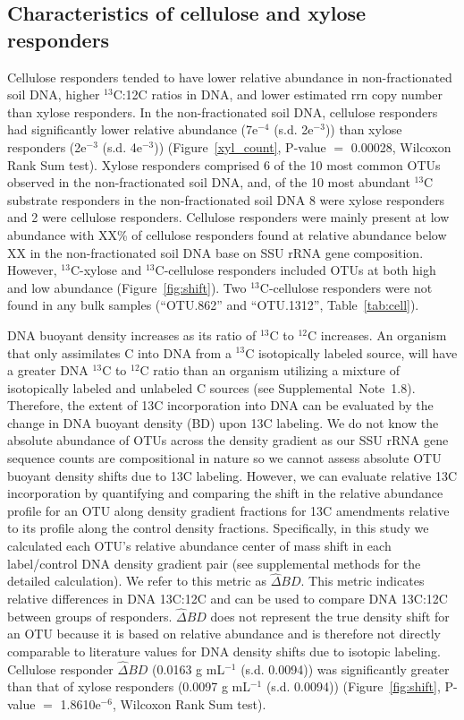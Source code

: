 \subsection{Characteristics of cellulose and xylose responders}
Cellulose responders tended to have lower relative abundance in
non-fractionated soil DNA, higher $^{13}$C:12C ratios in DNA, and lower estimated
rrn copy number than xylose responders. In the non-fractionated soil DNA,
cellulose responders had significantly lower relative abundance (7e$^{-4}$
(s.d. 2e$^{-3}$)) than xylose responders (2e$^{-3}$ (s.d. 4e$^{-3}$))
(Figure~\ref{xyl_count}, P-value $=$ 0.00028, Wilcoxon Rank Sum test). Xylose
responders comprised 6 of the 10 most common OTUs observed in the
non-fractionated soil DNA, and, of the 10 most abundant $^{13}$C substrate
responders in the non-fractionated soil DNA
8 were xylose responders and 2 were cellulose responders. Cellulose responders
were mainly present at low abundance with XX\% of cellulose responders found at
relative abundance below XX in the non-fractionated soil DNA base on SSU rRNA
gene composition. However, $^{13}$C-xylose and $^{13}$C-cellulose responders
included OTUs at both high and low abundance (Figure~\ref{fig:shift}). Two
$^{13}$C-cellulose responders were not found in any bulk samples (``OTU.862''
and ``OTU.1312'', Table~\ref{tab:cell}).

DNA buoyant density increases as its ratio of $^{13}$C to $^{12}$C increases.
An organism that only assimilates C into DNA from a $^{13}$C isotopically
labeled source, will have a greater DNA $^{13}$C to $^{12}$C ratio 
than an organism utilizing a mixture of isotopically labeled and unlabeled
C sources (see Supplemental~Note~1.8). Therefore, the extent of 13C
incorporation into DNA can be evaluated by the change in DNA buoyant density
(BD) upon 13C labeling. We do not know the absolute abundance of OTUs across
the density gradient as our SSU rRNA gene sequence counts are compositional in
nature so we cannot assess absolute OTU buoyant density shifts due to 13C
labeling. However, we can evaluate relative 13C incorporation by quantifying
and comparing the shift in the relative abundance profile for an OTU along
density gradient fractions for 13C amendments relative to its profile along the
control density fractions. Specifically, in this study we calculated each OTU's
relative abundance center of mass shift in each label/control DNA density
gradient pair (see supplemental methods for the detailed calculation). We refer
to this metric as $\hat{\Delta}BD$. This metric indicates relative differences
in DNA 13C:12C and can be used to compare DNA 13C:12C between groups of
responders. $\hat{\Delta}BD$ does not represent the true density shift for an
OTU because it is based on relative abundance and is therefore not directly
comparable to literature values for DNA density shifts due to isotopic
labeling. Cellulose responder $\hat{\Delta}BD$ (0.0163 g mL$^{-1}$ (s.d.
0.0094)) was significantly greater than that of xylose responders (0.0097
g mL$^{-1}$ (s.d. 0.0094)) (Figure~\ref{fig:shift}, P-value $=$ 1.8610e$^{-6}$, Wilcoxon Rank Sum test). 

